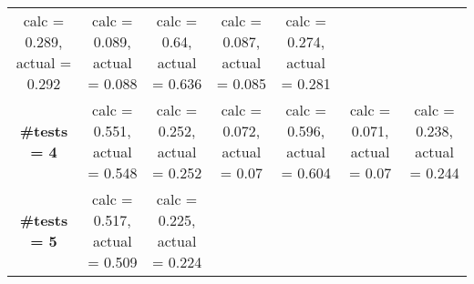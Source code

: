 \documentclass[
]{article}
\begin{document}
\begin{longtable}[]{@{}ccccccc@{}}
\begin{minipage}[t]{0.12\columnwidth}
calc = 0.289, actual = 0.292\strut
\end{minipage} & \begin{minipage}[t]{0.12\columnwidth}\centering
calc = 0.089, actual = 0.088\strut
\end{minipage} & \begin{minipage}[t]{0.12\columnwidth}\centering
calc = 0.64, actual = 0.636\strut
\end{minipage} & \begin{minipage}[t]{0.12\columnwidth}\centering
calc = 0.087, actual = 0.085\strut
\end{minipage} & \begin{minipage}[t]{0.12\columnwidth}\centering
calc = 0.274, actual = 0.281\strut
\end{minipage}\tabularnewline
\begin{minipage}[t]{0.07\columnwidth}\centering
\textbf{\#tests = 4}\strut
\end{minipage} & \begin{minipage}[t]{0.12\columnwidth}\centering
calc = 0.551, actual = 0.548\strut
\end{minipage} & \begin{minipage}[t]{0.12\columnwidth}\centering
calc = 0.252, actual = 0.252\strut
\end{minipage} & \begin{minipage}[t]{0.12\columnwidth}\centering
calc = 0.072, actual = 0.07\strut
\end{minipage} & \begin{minipage}[t]{0.12\columnwidth}\centering
calc = 0.596, actual = 0.604\strut
\end{minipage} & \begin{minipage}[t]{0.12\columnwidth}\centering
calc = 0.071, actual = 0.07\strut
\end{minipage} & \begin{minipage}[t]{0.12\columnwidth}\centering
calc = 0.238, actual = 0.244\strut
\end{minipage}\tabularnewline
\begin{minipage}[t]{0.07\columnwidth}\centering
\textbf{\#tests = 5}\strut
\end{minipage} & \begin{minipage}[t]{0.12\columnwidth}\centering
calc = 0.517, actual = 0.509\strut
\end{minipage} & \begin{minipage}[t]{0.12\columnwidth}\centering
calc = 0.225, actual = 0.224\strut
\end{minipage} & \begin{minipage}[t]{0.12\columnwidth}\centering

\end{minipage}
\end{longtable}
\end{document}
